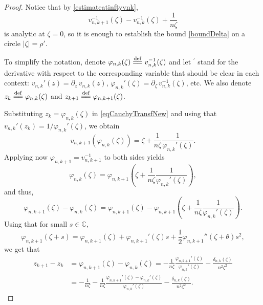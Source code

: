 \documentclass[10pt,a4paper]{amsart}
\theoremstyle{plain}
\theoremstyle{remark}
\newcommand{\C}{\mathbb{C}}
\newcommand{\isdef}{\overset{\mathrm{def}}{=\joinrel=}}
\begin{document}
\begin{proof}
Notice that by \eqref{estimateatinftyvnk}, 
$$
v_{n,k+1}^{-1}\left(\zeta\right)-v_{n, k}^{-1}(\zeta) +\frac{1}{n \zeta} 
$$
is analytic at $\zeta=0$, so it is enough to establish the bound \eqref{boundDelta} on a circle $|\zeta|=\rho'$.

To simplify the notation, denote $\varphi_{n, k}(\zeta)\isdef v_{n, k}^{-1}(\zeta)$ and let $^\prime$ stand for the derivative with respect to the corresponding variable that should be clear in each context: $v_{n, k}'(z)=\partial_z \,   v_{n, k}(z)$, $\varphi_{n, k}'(\zeta)=\partial_\zeta \,   v_{n, k}^{-1}(\zeta)$, etc. We also denote $z_k\isdef \varphi_{n, k}(\zeta)$ and $z_{k+1}\isdef \varphi_{n, k+1}(\zeta)$. 

Substituting $z_k=\varphi_{n, k}(\zeta)$ in \eqref{eqCauchyTransfNew} and using that $ v_{n, k}'(z_k)=1/ \varphi_{n, k}'(\zeta)$, we obtain
$$
v_{n, k+1}\left( \varphi_{n, k}(\zeta) \right)
=\zeta +\frac{1}{n \zeta} \frac{1}{\varphi_{n, k}'(\zeta) }.
$$
Applying now $\varphi_{n, k+1}=v_{n, k+1}^{-1}$ to both sides yields
$$
\varphi_{n, k}(\zeta) =\varphi_{n, k+1}\left( \zeta +\frac{1}{n \zeta} \frac{1}{\varphi_{n, k}'(\zeta) }\right),
$$
and thus,
\begin{equation}
    \label{firstidentityPhi1}
\varphi_{n, k+1}(\zeta)- \varphi_{n, k}(\zeta) =  \varphi_{n, k+1}(\zeta) - \varphi_{n, k+1}\left( \zeta +\frac{1}{n \zeta} \frac{1}{\varphi_{n, k}'(\zeta) }\right).
\end{equation}
Using that for small $s\in \C$,
\begin{equation}
    \label{taylorEx}
 \varphi_{n, k+1}\left( \zeta +s\right)= \varphi_{n, k+1}\left( \zeta \right)+ \varphi_{n, k+1}'\left( \zeta \right) s + \frac{1}{2}\varphi_{n, k+1}''\left( \zeta +\theta \right) s^2,
\end{equation}
we get that 
\begin{equation}
    \label{identityPhi1}
    \begin{split}    
  z_{k+1}-z_k & =   \varphi_{n, k+1}(\zeta)- \varphi_{n, k}(\zeta)  =  -\frac{1}{n \zeta} \frac{\varphi_{n, k+1}'\left( \zeta \right)}{\varphi_{n, k}'(\zeta) }-\frac{\delta_{n, k}(\zeta)}{n^2 \zeta^2} \\
&  = -\frac{1}{n \zeta} -\frac{1}{n \zeta} \frac{\varphi_{n, k+1}'\left( \zeta \right)-\varphi_{n, k}'\left( \zeta \right)}{\varphi_{n, k}'(\zeta) }-\frac{\delta_{n, k}(\zeta)}{n^2 \zeta^2}. 
\end{split}
\end{equation}


\end{proof}
\end{document}
